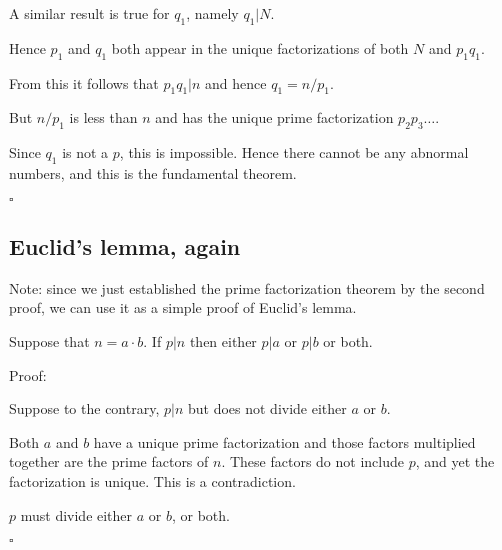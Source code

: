 \documentclass[11pt, oneside]{article}
\begin{document}
A similar result is true for $q_1$, namely $q_1 | N$.  

Hence $p_1$ and $q_1$ both appear in the unique factorizations of both $N$ and $p_1 q_1$.

From this it follows that $p_1 q_1 | n$ and hence $q_1 = n/p_1$.  

But $n/p_1$ is less than $n$ and has the unique prime factorization $p_2 p_3 \dots$.

Since $q_1$ is not a $p$, this is impossible.  Hence there cannot be any abnormal numbers, and this is the fundamental theorem.

$\square$

\subsection*{Euclid's lemma, again}

Note:  since we just established the prime factorization theorem by the second proof, we can use it as a simple proof of Euclid's lemma.  

Suppose that $n=a \cdot b$.  If  $p | n$ then either $p | a$ or $p | b$ or both.

Proof:

Suppose to the contrary, $p | n$ but does not divide either $a$ or $b$.

Both $a$ and $b$ have a unique prime factorization and those factors multiplied together are the prime factors of $n$.  These factors do not include $p$, and yet the factorization is  unique.  This is a contradiction.

$p$ must divide either $a$ or $b$, or both.

$\square$
\end{document}
